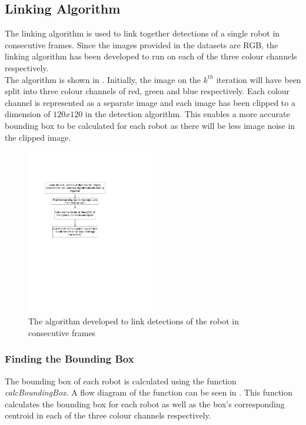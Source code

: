 \documentclass{article}
\begin{document}
\subsection{Linking Algorithm}
\label{sec:linking}
The linking algorithm is used to link together detections of a single robot in consecutive frames. Since the images provided in the datasets are RGB, the linking algorithm has been developed to run on each of the three colour channels respectively.\\ 

The algorithm is shown in . Initially, the image on the $k^{th}$ iteration will have been split into three colour channels of red, green and blue respectively. Each colour channel is represented as a separate image and each image has been clipped to a dimension of $120x120$ in the detection algorithm. This enables a more accurate bounding box to be calculated for each robot as there will be less image noise in the clipped image.  \\


\begin{figure}[h!] 
  \centering
    \includegraphics[width=0.5\textwidth]{../Drawings/linkingAlgorithm.pdf}
    \caption{The algorithm developed to link detections of the robot in consecutive frames}
    \label{fig:link}
\end{figure}

\subsubsection{Finding the Bounding Box}
\label{sec:boundbox}

The bounding box of each robot is calculated using the function \textit{calcBoundingBox}. A flow diagram of the function can be seen in . This function calculates the bounding box for each robot as well as the box's corresponding centroid in each of the three colour channels respectively.
\end{document}
